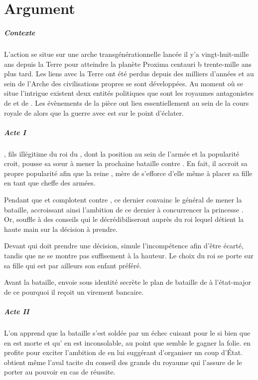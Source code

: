 \chapter{Argument}

\paragraph{Contexte}
L’action se situe sur une arche transgénérationnelle lancée il y’a vingt-huit-mille ans depuis la Terre pour atteindre la planète Proxima centauri b trente-mille ans plus tard. Les liens avec la Terre ont été perdus depuis des milliers d’années et au sein de l’Arche des civilisations propres se sont développées. Au moment où se situe l’intrigue existent deux entités politiques que sont les royaumes antagonistes de \campprincipal{} et de \campoppose{}.
Les évènements de la pièce ont lieu essentiellement au sein de la cours royale de \campprincipal{} alors que la guerre avec \campoppose{} est sur le point d’éclater.

\paragraph{Acte I}
\elena{}, fils illégitime du roi du \campprincipal, dont la position au sein de l’armée et la popularité croit, pousse sa sœur \princesse{} à mener la prochaine bataille contre \campoppose{}. En fait, il accroit sa propre popularité afin que la reine \reine{}, mère de \princesse{}  s’efforce d’elle même à placer sa fille en tant que cheffe des armées.

Pendant que \reine{} et \princesse{} complotent contre \elena{},
ce dernier convainc le général \general{} de mener la bataille, accroissant ainsi l’ambition de ce dernier à concurrencer la princesse \princesse{}. Or, \elena{} souffle à \general{} des conseils qui le décrédibiliseront auprès du roi \roi{} lequel détient la haute main sur la décision à prendre.

Devant \roi{} qui doit prendre une décision, \elena{} simule l’incompétence afin d’être écarté, tandis que \general{} ne se montre pas suffisement à la hauteur. Le choix du roi se porte sur sa fille \princesse{} qui est par ailleurs son enfant préféré.

Avant la bataille, \elena{} envoie sous identité secrète le plan de bataille de \princesse{} à l’état-major de \campoppose{} ce pourquoi il reçoit un virement bancaire.

\paragraph{Acte II}
L’on apprend que la bataille s’est soldée par un échec cuisant pour le \campprincipal{} si bien que \princesse{} en est morte et qu’\roi{} en est inconsolable, au point que semble le gagner la folie. \elena{} en profite pour exciter l’ambition de \general{} en lui suggérant d’organiser un coup d’État. \general{} obtient même l’aval tacite du conseil des grands du royaume qui l’assure de le porter au pouvoir en cas de réussite.

